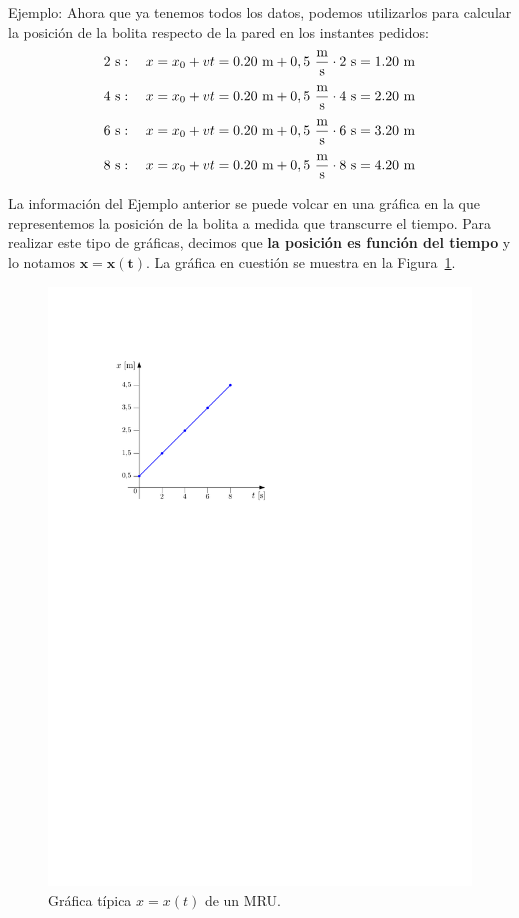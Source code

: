 \begin{example}{Ejemplo:}
  Ahora que ya tenemos todos los datos, podemos utilizarlos para calcular la posición de la bolita respecto de la pared en los instantes pedidos:
  $$2\ \mbox{s}:\quad x = x_0 + vt = 0.20\ \mbox{m} + 0,5\ \frac{\mbox{m}}{\mbox{s}} \cdot 2\ \mbox{s} = 1.20\ \mbox{m}$$
  $$4\ \mbox{s}:\quad x = x_0 + vt = 0.20\ \mbox{m} + 0,5\ \frac{\mbox{m}}{\mbox{s}} \cdot 4\ \mbox{s} = 2.20\ \mbox{m}$$
  $$6\ \mbox{s}:\quad x = x_0 + vt = 0.20\ \mbox{m} + 0,5\ \frac{\mbox{m}}{\mbox{s}} \cdot 6\ \mbox{s} = 3.20\ \mbox{m}$$
  $$8\ \mbox{s}:\quad x = x_0 + vt = 0.20\ \mbox{m} + 0,5\ \frac{\mbox{m}}{\mbox{s}} \cdot 8\ \mbox{s} = 4.20\ \mbox{m}$$
\end{example}

La información del Ejemplo anterior se puede volcar en una gráfica en la que representemos la posición de la bolita a medida que transcurre el tiempo. Para realizar este tipo de gráficas, decimos que {\bf la posición es función del tiempo} y lo notamos $\mathbold{x=x(t)}$. La gráfica en cuestión se muestra en la Figura~\ref{fig:grafica_MRU_x}.


\begin{figure}[!h]
  \centering
  \includegraphics[scale=1]{img/grafica_MRU_x.pdf}
  \caption{\label{fig:grafica_MRU_x} Gráfica típica $x=x(t)$ de un MRU.}
\end{figure}

